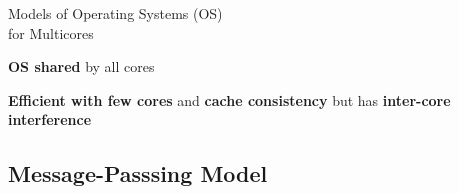 \begin{frame}[t]{Models of Operating Systems (OS)\\for Multicores}
\begin{overprint}
{				%



				\begin{center}
					\textbf{OS shared} by all cores
				\end{center}
				\begin{center}
					\textbf{Efficient with few cores} and \textbf{cache consistency} but has \textbf{inter-core interference}
				\end{center}
			}
		\end{overprint}

		\end{frame}

	\subsection{Message-Passsing Model}

